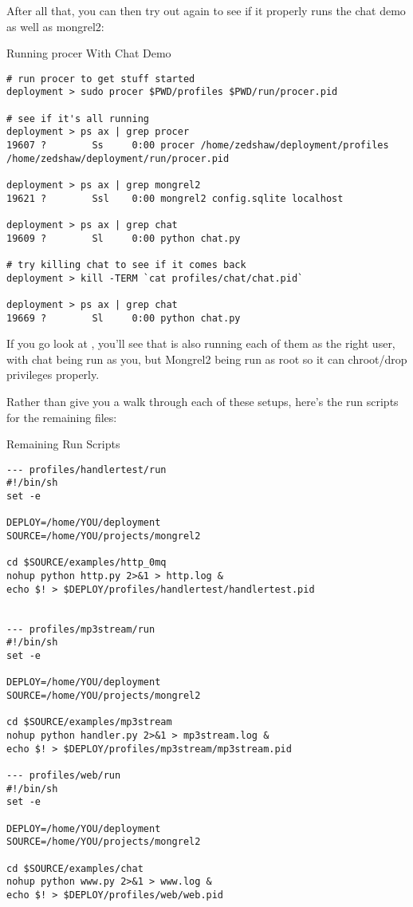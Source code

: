 After all that, you can then try out  again to see if it
properly runs the chat demo as well as mongrel2:

\begin{code}{Running procer With Chat Demo}
\begin{Verbatim}
# run procer to get stuff started
deployment > sudo procer $PWD/profiles $PWD/run/procer.pid

# see if it's all running
deployment > ps ax | grep procer
19607 ?        Ss     0:00 procer /home/zedshaw/deployment/profiles /home/zedshaw/deployment/run/procer.pid

deployment > ps ax | grep mongrel2
19621 ?        Ssl    0:00 mongrel2 config.sqlite localhost

deployment > ps ax | grep chat
19609 ?        Sl     0:00 python chat.py

# try killing chat to see if it comes back
deployment > kill -TERM `cat profiles/chat/chat.pid`

deployment > ps ax | grep chat
19669 ?        Sl     0:00 python chat.py
\end{Verbatim}
\end{code}

If you go look at , you'll see that 
is also running each of them as the right user, with chat being run
as you, but Mongrel2 being run as root so it can chroot/drop privileges properly.

Rather than give you a walk through each of these setups, here's the
run scripts for the remaining files:

\begin{code}{Remaining Run Scripts}
\begin{Verbatim}
--- profiles/handlertest/run
#!/bin/sh
set -e

DEPLOY=/home/YOU/deployment
SOURCE=/home/YOU/projects/mongrel2

cd $SOURCE/examples/http_0mq
nohup python http.py 2>&1 > http.log &
echo $! > $DEPLOY/profiles/handlertest/handlertest.pid


--- profiles/mp3stream/run
#!/bin/sh
set -e

DEPLOY=/home/YOU/deployment
SOURCE=/home/YOU/projects/mongrel2

cd $SOURCE/examples/mp3stream
nohup python handler.py 2>&1 > mp3stream.log &
echo $! > $DEPLOY/profiles/mp3stream/mp3stream.pid

--- profiles/web/run
#!/bin/sh
set -e

DEPLOY=/home/YOU/deployment
SOURCE=/home/YOU/projects/mongrel2

cd $SOURCE/examples/chat
nohup python www.py 2>&1 > www.log &
echo $! > $DEPLOY/profiles/web/web.pid

\end{Verbatim}
\end{code}


